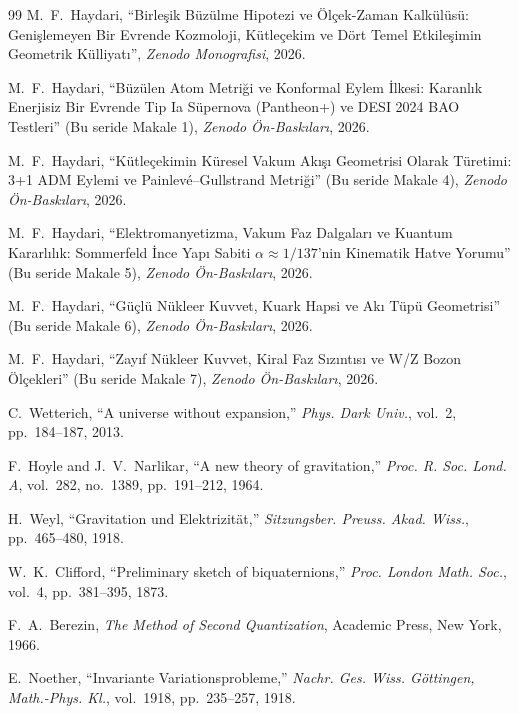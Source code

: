 \documentclass[11pt,a4paper]{article}
\begin{document}
\begin{thebibliography}{99}
    M.~F.~Haydari, ``Birleşik Büzülme Hipotezi ve Ölçek-Zaman Kalkülüsü: Genişlemeyen Bir Evrende Kozmoloji, Kütleçekim ve Dört Temel Etkileşimin Geometrik Külliyatı'', \textit{Zenodo Monografisi}, 2026.

    M.~F.~Haydari, ``Büzülen Atom Metriği ve Konformal Eylem İlkesi: Karanlık Enerjisiz Bir Evrende Tip Ia Süpernova (Pantheon+) ve DESI 2024 BAO Testleri'' (Bu seride Makale 1), \textit{Zenodo Ön-Baskıları}, 2026.

    M.~F.~Haydari, ``Kütleçekimin Küresel Vakum Akışı Geometrisi Olarak Türetimi: 3+1 ADM Eylemi ve Painlevé--Gullstrand Metriği'' (Bu seride Makale 4), \textit{Zenodo Ön-Baskıları}, 2026.

    M.~F.~Haydari, ``Elektromanyetizma, Vakum Faz Dalgaları ve Kuantum Kararlılık: Sommerfeld İnce Yapı Sabiti $\alpha \approx 1/137$'nin Kinematik Hatve Yorumu'' (Bu seride Makale 5), \textit{Zenodo Ön-Baskıları}, 2026.

    M.~F.~Haydari, ``Güçlü Nükleer Kuvvet, Kuark Hapsi ve Akı Tüpü Geometrisi'' (Bu seride Makale 6), \textit{Zenodo Ön-Baskıları}, 2026.

    M.~F.~Haydari, ``Zayıf Nükleer Kuvvet, Kiral Faz Sızıntısı ve W/Z Bozon Ölçekleri'' (Bu seride Makale 7), \textit{Zenodo Ön-Baskıları}, 2026.

    C.~Wetterich, ``A universe without expansion,'' \textit{Phys. Dark Univ.}, vol.~2, pp.~184--187, 2013.

    F.~Hoyle and J.~V.~Narlikar, ``A new theory of gravitation,'' \textit{Proc. R. Soc. Lond. A}, vol.~282, no.~1389, pp.~191--212, 1964.

    H.~Weyl, ``Gravitation und Elektrizit\"at,'' \textit{Sitzungsber. Preuss. Akad. Wiss.}, pp.~465--480, 1918.

    W.~K.~Clifford, ``Preliminary sketch of biquaternions,'' \textit{Proc. London Math. Soc.}, vol.~4, pp.~381--395, 1873.

    F.~A.~Berezin, \textit{The Method of Second Quantization}, Academic Press, New York, 1966.

    E.~Noether, ``Invariante Variationsprobleme,'' \textit{Nachr. Ges. Wiss. G\"ottingen, Math.-Phys. Kl.}, vol.~1918, pp.~235--257, 1918.
\end{thebibliography}
\end{document}
